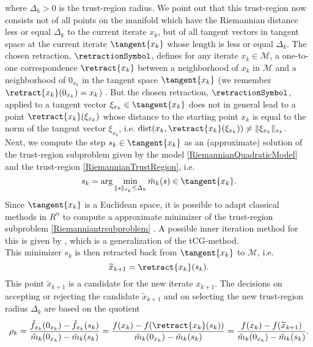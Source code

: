 where $\Delta_k > 0$ is the trust-region radius. We point out that this trust-region now consists not of all points on the manifold which have the Riemannian distance less or equal $\Delta_k$ to the current iterate $x_k$, but of all tangent vectors in tangent space at the current iterate $\tangent{x_k}$ whose length is less or equal $\Delta_k$. The chosen retraction, $\retractionSymbol$, defines for any iterate $x_k \in \mathcal{M}$, a one-to-one correspondence $\retract{x_k}$ between a neighborhood of $x_k$ in $\mathcal{M}$ and a neighborhood of $0_{x_k}$ in the tangent space $\tangent{x_k}$ (we remember $\retract{x_k}(0_{x_k}) = x_k$) \cite[p.~304]{AbsilBakerGallivan:2007}. But the chosen retraction, $\retractionSymbol$, applied to a tangent vector $\xi_{x_k} \in \tangent{x_k}$ does not in general lead to a point $\retract{x_k}(\xi_{x_k})$ whose distance to the starting point $x_k$ is equal to the norm of the tangent vector $\xi_{x_k}$, i.e. $\operatorname{dist}(x_k, \retract{x_k}(\xi_{x_k})) \neq \lVert \xi_{x_k} \rVert_{x_k}$. \\
Next, we compute the step $s_k \in \tangent{x_k}$ as an (approximate) solution of the trust-region subproblem given by the model \cref{RiemannianQuadraticModel} and the trust-region \cref{RiemannianTrustRegion}, i.e.
\begin{equation}\label{Riemanniantrsubproblem}
    s_k = \arg \min_{\lVert s \rVert_{x_k} \leq \Delta_k} \hat{m}_k( s ) \in \tangent{x_k}.
\end{equation}
Since $\tangent{x_k}$ is a Euclidean space, it is possible to adapt classical methods in $R^n$ to compute a approximate minimizer of the trust-region subproblem \cref{Riemanniantrsubproblem} \cite[p.~304]{AbsilBakerGallivan:2007}. A possible inner iteration method for this is given by \cite[Algorithm~11]{AbsilMahonySepulchre:2008}, which is a generalization of the tCG-method. \\
This minimizer $s_k$ is then retracted back from $\tangent{x_k}$ to $\mathcal{M}$, i.e.
\begin{equation*}
    \widetilde{x}_{k+1} = \retract{x_k}(s_k).
\end{equation*}
This point $\widetilde{x}_{k+1}$ is a candidate for the new iterate $x_{k+1}$. The decisions on accepting or rejecting the candidate $\widetilde{x}_{k+1}$ and on selecting the new trust-region radius $\Delta_k$ are based on the quotient
\begin{equation*}
    \rho_k = \frac{\hat{f}_{x_k}(0_{x_k}) - \hat{f}_{x_k}(s_k)}{\hat{m}_k(0_{x_k}) - \hat{m}_k(s_k)} = \frac{f(x_k) - f(\retract{x_k}(s_k))}{\hat{m}_k(0_{x_k}) - \hat{m}_k(s_k)} = \frac{f(x_k) - f(\widetilde{x}_{k+1})}{\hat{m}_k(0_{x_k}) - \hat{m}_k(s_k)}.
\end{equation*}
